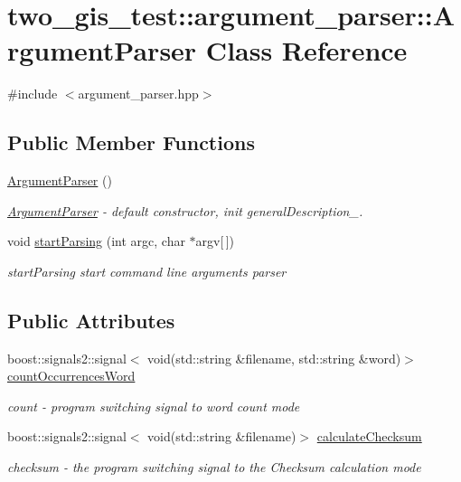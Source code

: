 \hypertarget{classtwo__gis__test_1_1argument__parser_1_1_argument_parser}{}\section{two\+\_\+gis\+\_\+test\+:\+:argument\+\_\+parser\+:\+:Argument\+Parser Class Reference}
\label{classtwo__gis__test_1_1argument__parser_1_1_argument_parser}


{\ttfamily \#include $<$argument\+\_\+parser.\+hpp$>$}

\subsection*{Public Member Functions}
\begin{DoxyCompactItemize}
\item 
\hyperlink{classtwo__gis__test_1_1argument__parser_1_1_argument_parser_a60b6545a121f02ce271e98b40d7635fc}{Argument\+Parser} ()
\begin{DoxyCompactList}\small\item\em \hyperlink{classtwo__gis__test_1_1argument__parser_1_1_argument_parser}{Argument\+Parser} -\/ default constructor, init general\+Description\+\_\+. \end{DoxyCompactList}\item 
void \hyperlink{classtwo__gis__test_1_1argument__parser_1_1_argument_parser_a02248a1453c8dc2e947f173f9b5cfc9b}{start\+Parsing} (int argc, char $\ast$argv\mbox{[}$\,$\mbox{]})
\begin{DoxyCompactList}\small\item\em start\+Parsing start command line arguments parser \end{DoxyCompactList}\end{DoxyCompactItemize}
\subsection*{Public Attributes}
\begin{DoxyCompactItemize}
\item 
boost\+::signals2\+::signal$<$ void(std\+::string \&filename, std\+::string \&word)$>$ \hyperlink{classtwo__gis__test_1_1argument__parser_1_1_argument_parser_a9fdaea74b7ce00d7cc39c797745b9436}{count\+Occurrences\+Word}
\begin{DoxyCompactList}\small\item\em count -\/ program switching signal to word count mode \end{DoxyCompactList}\item 
boost\+::signals2\+::signal$<$ void(std\+::string \&filename)$>$ \hyperlink{classtwo__gis__test_1_1argument__parser_1_1_argument_parser_ac02b2454df0eb6f127cadb0ccfdad67c}{calculate\+Checksum}
\begin{DoxyCompactList}\small\item\em checksum -\/ the program switching signal to the Checksum calculation mode \end{DoxyCompactList}\end{DoxyCompactItemize}


